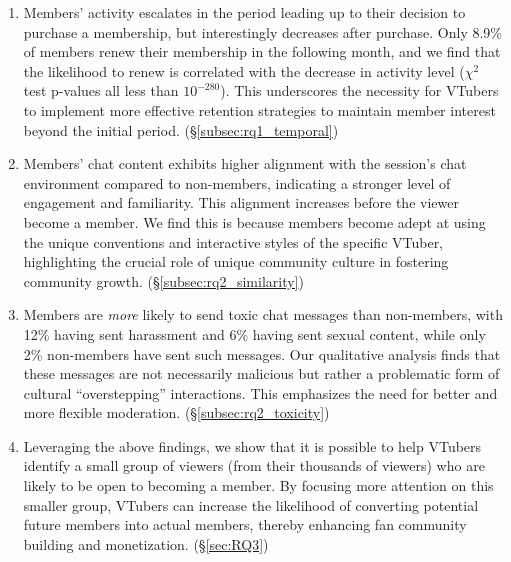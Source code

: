 \begin{enumerate}[leftmargin=*]
    

    \item Members' activity escalates in the period leading up to their decision to purchase a membership, but interestingly decreases after purchase. Only 8.9\% of members renew their membership in the following month, and we find that the likelihood to renew is correlated with the decrease in activity level ($\chi^2$ test p-values all less than $10^{-280}$). This underscores the necessity for VTubers to implement more effective retention strategies to maintain member interest beyond the initial period. (\S\ref{subsec:rq1_temporal}) 
    
    \item Members' chat content exhibits higher alignment with the session’s chat environment compared to non-members, indicating a stronger level of engagement and familiarity. This alignment increases before the viewer become a member. We find this is because members become adept at using the unique conventions and interactive styles of the specific VTuber, highlighting the crucial role of unique community culture in fostering community growth. (\S\ref{subsec:rq2_similarity})
    
    \item Members are \emph{more} likely to send toxic chat messages than non-members, with 12\% having sent harassment and 6\% having sent sexual content, while only 2\% non-members have sent such messages. Our qualitative analysis finds that these messages are not necessarily malicious but rather a problematic form of cultural ``overstepping'' interactions. This emphasizes the need for better and more flexible moderation. (\S\ref{subsec:rq2_toxicity})

    \item Leveraging the above findings, we show that it is possible to help VTubers identify a small group of viewers (from their thousands of viewers) who are likely to be open to becoming a member. By focusing more attention on this smaller group, VTubers can increase the likelihood of converting potential future members into actual members, thereby enhancing fan community building and monetization. (\S\ref{sec:RQ3})
\end{enumerate}

